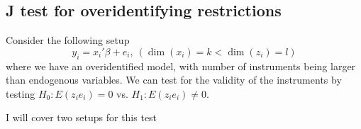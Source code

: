 \documentclass[12pt]{article}
\theoremstyle{definition}
\theoremstyle{property}
\theoremstyle{assumption}
\theoremstyle{example}
\theoremstyle{comment}
\newtheorem{comment}{Comment}[section]
\begin{document}
\begin{mdframed}[backgroundcolor=yellow!5]

\end{mdframed}
\subsection{J test for overidentifying restrictions}
Consider the following setup
\[
y_i = x_i'\beta+e_i, \ (\dim(x_i)=k<\dim(z_i)=l) 
\]
where we have an overidentified model, with number of instruments being larger than endogenous variables. We can test for the validity of the instruments by testing $H_0: E(z_ie_i)=0$ vs. $H_1: E(z_ie_i)\neq0$. 
\par
I will cover two setups for this test
\end{document}

